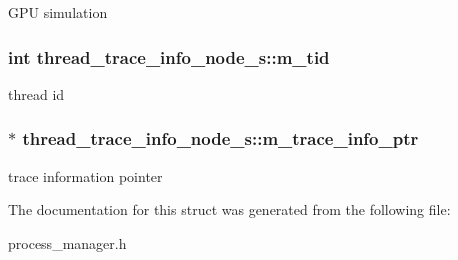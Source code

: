 \label{structthread__trace__info__node__s_a0355328ae8596c5029df7ac4a2c0eca7}
GPU simulation \hypertarget{structthread__trace__info__node__s_a52c5e7d8ed10fc7c54cdabcc15702cac}{
\subsubsection[{m\_\-tid}]{\setlength{\rightskip}{0pt plus 5cm}int {\bf thread\_\-trace\_\-info\_\-node\_\-s::m\_\-tid}}}
\label{structthread__trace__info__node__s_a52c5e7d8ed10fc7c54cdabcc15702cac}
thread id \hypertarget{structthread__trace__info__node__s_ae603dda796c0cccf7f79d1ce5b9ce874}{
\subsubsection[{m\_\-trace\_\-info\_\-ptr}]{$\ast$ {\bf thread\_\-trace\_\-info\_\-node\_\-s::m\_\-trace\_\-info\_\-ptr}}}
\label{structthread__trace__info__node__s_ae603dda796c0cccf7f79d1ce5b9ce874}
trace information pointer 

The documentation for this struct was generated from the following file:\begin{DoxyCompactItemize}
\item 
process\_\-manager.h\end{DoxyCompactItemize}
